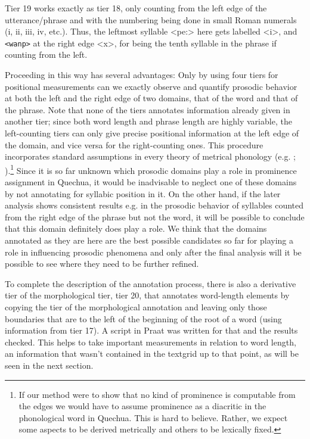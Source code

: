 \documentclass[output=paper]{LSP/langsci}
\begin{document}
Tier 19 works exactly as tier 18, only counting from the left edge of the utterance/phrase and with the numbering being done in small Roman numerals (i, ii, iii, iv, etc.). Thus, the leftmost syllable <pe\textipa:> here gets labelled <i>, and \texttt{<wanp>} at the right edge <x>, for being the tenth syllable in the phrase if counting from the left. 

Proceeding in this way has several advantages: Only by using four tiers for positional measurements can we exactly observe and quantify prosodic behavior at both the left and the right edge of two domains, that of the word and that of the phrase. Note that none of the tiers annotates information already given in another tier; since both word length and phrase length are highly variable, the left-counting tiers can only give precise positional information at the left edge of the domain, and vice versa for the right-counting ones. This procedure incorporates standard assumptions in every theory of metrical phonology (e.g. \citealt{Liberman1977,Hayes1995}; \citealt{Hulst1999}).\footnote{If our method were to show that no kind of prominence is computable from the edges we would have to assume prominence as a diacritic in the phonological word in Quechua. This is hard to believe. Rather, we expect some aspects to be derived metrically and others to be lexically fixed.} Since it is so far unknown which prosodic domains play a role in prominence assignment in Quechua, it would be inadvisable to neglect one of these domains by not annotating for syllabic position in it. On the other hand, if the later analysis shows consistent results e.g. in the prosodic behavior of syllables counted from the right edge of the phrase but not the word, it will be possible to conclude that this domain definitely does play a role. We think that the domains annotated as they are here are the best possible candidates so far for playing a role in influencing prosodic phenomena and only after the final analysis will it be possible to see where they need to be further refined.  

To complete the description of the annotation process, there is also a derivative tier of the morphological tier, tier 20, that annotates word-length elements by copying the tier of the morphological annotation and leaving only those boundaries that are to the left of the beginning of the root of a word (using information from tier 17). A script in {Praat} was written for that and the results checked. This helps to take important measurements in relation to word length, an information that wasn’t contained in the textgrid up to that point, as will be seen in the next section.       
\end{document}
